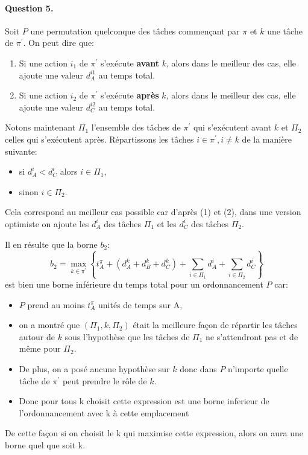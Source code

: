 \documentclass[a4paper, 10pt]{article}
\begin{document}
		\paragraph{Question 5.}{Soit $P$ une permutation quelconque des tâches commençant par $\pi$ et $k$ une tâche de $\pi^\prime$. On peut dire que:
		\begin{enumerate}
			\item Si une action $i_1$ de $\pi^\prime$ s'exécute \textbf{avant} $k$, alors dans le meilleur des cas, elle ajoute une valeur $d^{i1}_A$ au temps total. 
			\item Si une action $i_2$ de $\pi^\prime$  s'exécute \textbf{après} $k$, alors dans le meilleur des cas, elle ajoute une valeur $d^{i2}_C$ au temps total.
		\end{enumerate}
		
		Notons maintenant $\Pi_1$ l'ensemble des tâches de $\pi^\prime$ qui s'exécutent avant $k$ et $\Pi_2$ celles qui s'exécutent après. Répartissons les tâches $i \in \pi^\prime, i \ne k$ de la manière suivante:
		\begin{itemize}
			\item si $d^i_A < d^i_C$ alors $i \in \Pi_1$,
			\item sinon $i \in \Pi_2$.
		\end{itemize}
		Cela correspond au meilleur cas possible car d'après (1) et (2), dans une version optimiste on ajoute les $d^i_A$ des tâches $\Pi_1$ et les $d^i_C$ des tâches $\Pi_2$.
		
		Il en résulte que la borne $b_2$:
		\begin{equation*}
			b_2 = \max_{k \in \pi^\prime} \left\{ t^{\pi}_A + \left(d^k_A + d^k_B + d^k_C \right) + \sum_{i \in \Pi_1} d^i_A + \sum_{i \in \Pi_2} d^i_C \right\}
		\end{equation*}
		est bien une borne inférieure du temps total pour un ordonnancement $P$ car:
		\begin{itemize}
			\item $P$ prend au moins $t^\pi_A$ unités de temps sur A,
			\item on a montré que $\left(\Pi_1, k, \Pi_2\right)$ était la meilleure façon de répartir les tâches autour de $k$ sous l'hypothèse que les tâches de $\Pi_1$ ne s'attendront pas et de même pour $\Pi_2$.
			\item De plus, on a posé aucune hypothèse sur $k$ donc dans $P$ n'importe quelle tâche de $\pi^\prime$ peut prendre le rôle de $k$.
                        \item Donc pour tous k choisit cette expression est une borne inferieur de l'ordonnancement avec k à cette emplacement
		\end{itemize}
                De cette façon si on choisit le k qui maximise cette expression, alors on aura une borne quel que soit k.
		}
		
\end{document}
